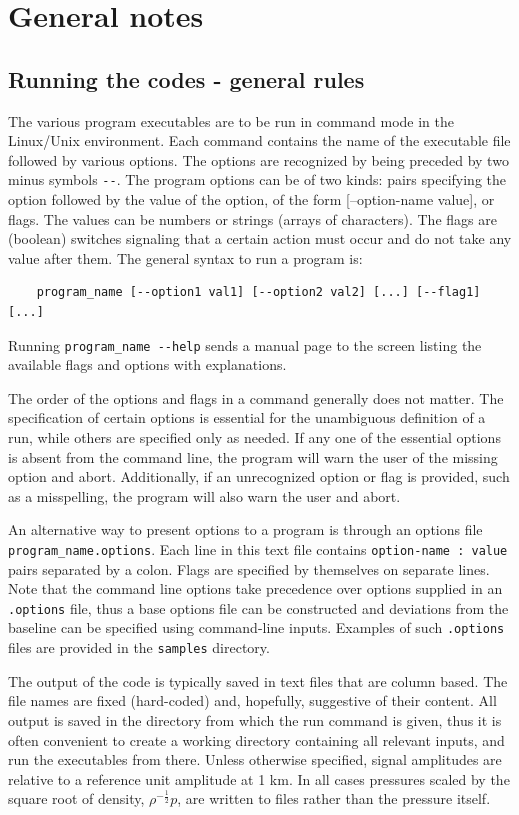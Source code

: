 
\section{General notes}

\subsection{Running the codes - general rules}
The various program executables are to be run in command mode in the Linux/Unix environment. Each command contains the name of the executable file followed by various options. The options are recognized by being preceded by two minus symbols \verb"--". The program options can be of two kinds: pairs specifying the option followed by the value of the option, of the form [--option-name  value], or flags. The values can be numbers or strings (arrays of characters). The flags are (boolean) switches signaling that a certain action must occur and do not take any value after them. The general syntax to run a program is:
\begin{verbatim} 
    program_name [--option1 val1] [--option2 val2] [...] [--flag1] [...] 
\end{verbatim}
Running \verb"program_name --help" sends a manual page to the screen listing the available flags and options with explanations. 

The order of the options and flags in a command generally does not matter. The specification of certain options is essential for the unambiguous definition of a run, while others are specified only as needed. If any one of the essential options is absent from the command line, the program will warn the user of the missing option and abort.  Additionally, if an unrecognized option or flag is provided, such as a misspelling, the program will also warn the user and abort.

An alternative way to present options to a program is through an options file \verb"program_name.options".  Each line in this text file contains \verb"option-name : value" pairs separated by a colon. Flags are specified by themselves on separate lines. Note that the command line options take precedence over options supplied  in an \verb".options" file, thus a base options file can be constructed and deviations from the baseline can be specified using command-line inputs. Examples of such \verb".options" files are provided in the \verb"samples" directory.

The output of the code is typically saved in text files that are column based. The file names are fixed (hard-coded) and, hopefully, suggestive of their content. All output is saved in the directory from which the run command is given, thus it is often convenient to create a working directory containing all relevant inputs, and run the executables from there. Unless otherwise specified, signal amplitudes are relative to a reference unit amplitude at 1 km. In all cases pressures scaled by the square root of density, $\rho^{-\frac{1}{2}}p$, are written to files rather than the pressure itself. 


